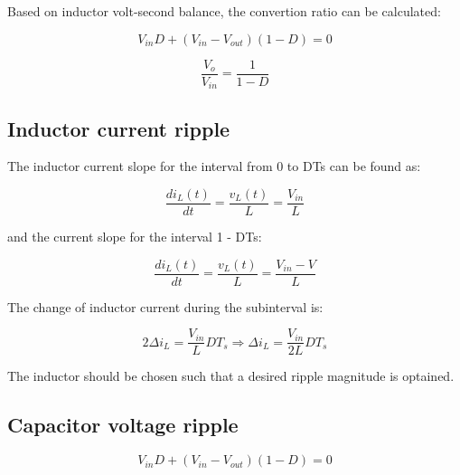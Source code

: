 Based on inductor volt-second balance, the convertion ratio can be calculated:

\begin{equation}
	V_{in}D + (V_{in}-V_{out})(1-D) = 0
	\label{eq:pumpHeadModel}
\end{equation}

\begin{equation}
	\frac{V_o}{V_{in}} = \frac{1}{1-D}
	\label{eq:pumpHeadMode5}
\end{equation}

\subsection{Inductor current ripple}\label{sec:SON}

The inductor current slope for the interval from 0 to DTs can be found as:

\begin{equation}
	\frac{di_{L}(t)}{dt} = \frac{v_{L}(t)}{L} = \frac{V_{in}}{L}
	\label{eq:pumpHeadMode5}
\end{equation}

and the current slope for the interval 1 - DTs:

\begin{equation}
	\frac{di_{L}(t)}{dt} = \frac{v_{L}(t)}{L} = \frac{V_{in} - V}{L}
	\label{eq:pumpHeadMode5}
\end{equation}

The change of inductor current during the subinterval is:

\begin{equation}
	2\Delta i_L = \frac{V_{in}}{L}DT_s \Rightarrow
  \Delta i_L = \frac{V_{in}}{2L}DT_s
	\label{eq:pumpHeadMode5}
\end{equation}

The inductor should be chosen such that a desired ripple magnitude is optained.

\subsection{Capacitor voltage ripple}\label{sec:SON}



\begin{equation}
	V_{in}D + (V_{in}-V_{out})(1-D) = 0
	\label{eq:pumpHeadModel}
\end{equation}

